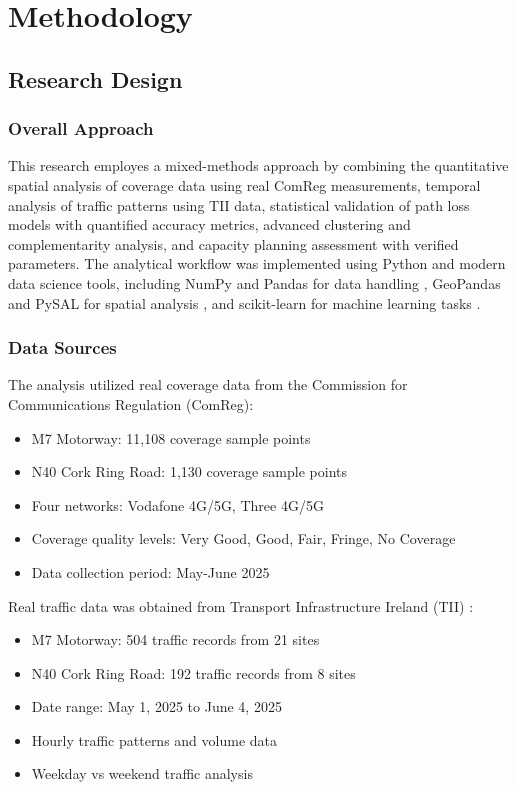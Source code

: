 \documentclass[MScCS]{uccthesis}
\begin{document}
\chapter{Methodology}

   \section{Research Design}

   \subsection{Overall Approach}
   This research employes a mixed-methods approach by combining the quantitative spatial analysis of coverage data using real ComReg measurements, temporal analysis of traffic patterns using TII data, statistical validation of path loss models with quantified accuracy metrics, advanced clustering and complementarity analysis, and capacity planning assessment with verified parameters. The analytical workflow was implemented using Python and modern data science tools, including NumPy and Pandas for data handling \cite{harris2020array,mckinney2017python}, GeoPandas and PySAL for spatial analysis \cite{jordahl2020geopandas,Rey2007}, and scikit-learn for machine learning tasks \cite{pedregosa2011scikit}.

   \subsection{Data Sources}
   The analysis utilized real coverage data from the Commission for Communications Regulation (ComReg):
   \begin{itemize}
   \item M7 Motorway: 11,108 coverage sample points
   \item N40 Cork Ring Road: 1,130 coverage sample points
   \item Four networks: Vodafone 4G/5G, Three 4G/5G
   \item Coverage quality levels: Very Good, Good, Fair, Fringe, No Coverage
   \item Data collection period: May-June 2025
   \end{itemize}

   Real traffic data was obtained from Transport Infrastructure Ireland (TII) :
   \begin{itemize}
   \item M7 Motorway: 504 traffic records from 21 sites
   \item N40 Cork Ring Road: 192 traffic records from 8 sites
   \item Date range: May 1, 2025 to June 4, 2025
   \item Hourly traffic patterns and volume data
   \item Weekday vs weekend traffic analysis
   \end{itemize}
\end{document}
